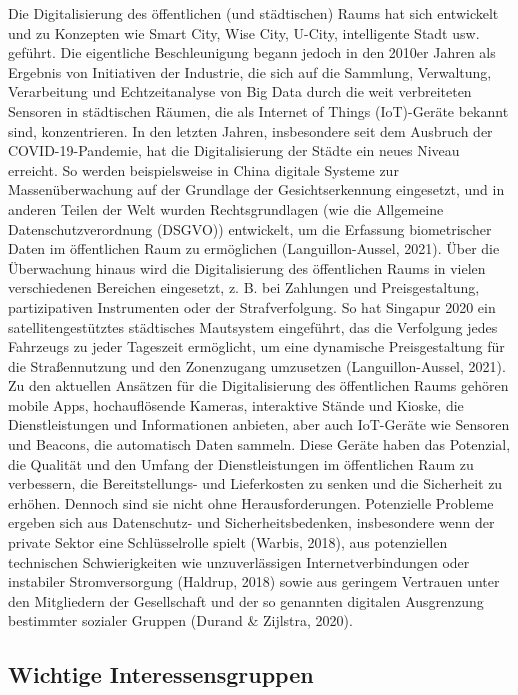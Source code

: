 \documentclass[
]{book}
\begin{document}
Die Digitalisierung des öffentlichen (und städtischen) Raums hat sich entwickelt und zu Konzepten wie Smart City, Wise City, U-City, intelligente Stadt usw. geführt. Die eigentliche Beschleunigung begann jedoch in den 2010er Jahren als Ergebnis von Initiativen der Industrie, die sich auf die Sammlung, Verwaltung, Verarbeitung und Echtzeitanalyse von Big Data durch die weit verbreiteten Sensoren in städtischen Räumen, die als Internet of Things (IoT)-Geräte bekannt sind, konzentrieren. In den letzten Jahren, insbesondere seit dem Ausbruch der COVID-19-Pandemie, hat die Digitalisierung der Städte ein neues Niveau erreicht. So werden beispielsweise in China digitale Systeme zur Massenüberwachung auf der Grundlage der Gesichtserkennung eingesetzt, und in anderen Teilen der Welt wurden Rechtsgrundlagen (wie die Allgemeine Datenschutzverordnung (DSGVO)) entwickelt, um die Erfassung biometrischer Daten im öffentlichen Raum zu ermöglichen (Languillon-Aussel, 2021). Über die Überwachung hinaus wird die Digitalisierung des öffentlichen Raums in vielen verschiedenen Bereichen eingesetzt, z. B. bei Zahlungen und Preisgestaltung, partizipativen Instrumenten oder der Strafverfolgung. So hat Singapur 2020 ein satellitengestütztes städtisches Mautsystem eingeführt, das die Verfolgung jedes Fahrzeugs zu jeder Tageszeit ermöglicht, um eine dynamische Preisgestaltung für die Straßennutzung und den Zonenzugang umzusetzen (Languillon-Aussel, 2021).
Zu den aktuellen Ansätzen für die Digitalisierung des öffentlichen Raums gehören mobile Apps, hochauflösende Kameras, interaktive Stände und Kioske, die Dienstleistungen und Informationen anbieten, aber auch IoT-Geräte wie Sensoren und Beacons, die automatisch Daten sammeln. Diese Geräte haben das Potenzial, die Qualität und den Umfang der Dienstleistungen im öffentlichen Raum zu verbessern, die Bereitstellungs- und Lieferkosten zu senken und die Sicherheit zu erhöhen. Dennoch sind sie nicht ohne Herausforderungen. Potenzielle Probleme ergeben sich aus Datenschutz- und Sicherheitsbedenken, insbesondere wenn der private Sektor eine Schlüsselrolle spielt (Warbis, 2018), aus potenziellen technischen Schwierigkeiten wie unzuverlässigen Internetverbindungen oder instabiler Stromversorgung (Haldrup, 2018) sowie aus geringem Vertrauen unter den Mitgliedern der Gesellschaft und der so genannten digitalen Ausgrenzung bestimmter sozialer Gruppen (Durand \& Zijlstra, 2020).

\hypertarget{wichtige-interessensgruppen-6}{%
\subsection*{Wichtige Interessensgruppen}\label{wichtige-interessensgruppen-6}}
\end{document}
